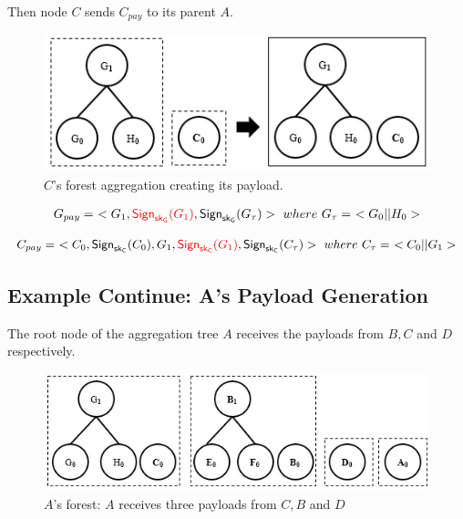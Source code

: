 \documentclass[%
  slidesonly,%
  semlayer%
  ]{seminar}                                  %
\newcommand{\sk}{\sf{sk}}
\begin{document}
\begin{slide}
      Then node $C$ sends $C_{pay}$ to its parent $A$.

      \begin{figure}[h!]
        \centering
        \includegraphics[scale = 0.5]{images/c-forest-payload.png}
        \caption{$C$'s forest aggregation creating its payload.}
        \label{fig:c-forest-payload}
      \end{figure}
      \begin{equation*}
        \begin{array}{l}
          G_{pay} =\ <G_{1},\textcolor{red}{\textsf{Sign}_{\sk_{G}}(G_{1})}, \textsf{Sign}_{\sk_{G}}(G_{\tau})>\ where\ G_{\tau} =\ <G_{0} || H_{0}>\\
        \end{array}
      \end{equation*}
      
      \begin{equation*}
        \begin{array}{l}
          C_{pay} =\ <C_{0},\textsf{Sign}_{\sk_{C}}(C_{0}),G_{1},\textcolor{red}{\textsf{Sign}_{\sk_{C}}(G_{1})}, \textsf{Sign}_{\sk_{C}}(C_{\tau})>\ where\ C_{\tau} =\ <C_{0} || G_{1}>\\
        \end{array}
      \end{equation*}

      \vfill
      \clearpage

    \subsection*{Example Continue: A's Payload Generation}  

      The root node of the aggregation tree $A$ receives the payloads from $B,C$ and $D$ respectively.
      
      \begin{figure}[h!]
        \centering
        \includegraphics[scale = 0.5]{images/a-forest.png}
        \caption{$A$'s forest: $A$ receives three payloads from $C,B$ and $D$}
        \label{fig:a-forest}
      \end{figure}
      \vfill
      \clearpage


\end{slide}
\end{document}
